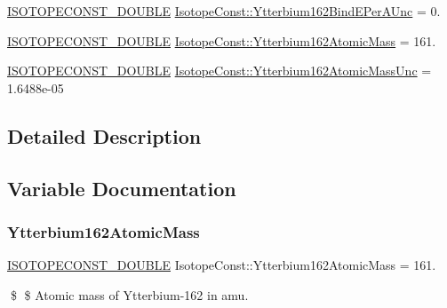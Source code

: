 \begin{DoxyCompactItemize}
\mbox{\hyperlink{group___isotope_const-_macros_ga8f45a7272ce02c0b4c65c44636ed719a}{I\+S\+O\+T\+O\+P\+E\+C\+O\+N\+S\+T\+\_\+\+D\+O\+U\+B\+LE}} \mbox{\hyperlink{group___isotope_const-_ytterbium-_yb162_ga373b56653d0e30d0dede9429f430666e}{Isotope\+Const\+::\+Ytterbium162\+Bind\+E\+Per\+A\+Unc}} = 0.
\item 
\mbox{\hyperlink{group___isotope_const-_macros_ga8f45a7272ce02c0b4c65c44636ed719a}{I\+S\+O\+T\+O\+P\+E\+C\+O\+N\+S\+T\+\_\+\+D\+O\+U\+B\+LE}} \mbox{\hyperlink{group___isotope_const-_ytterbium-_yb162_ga8205c9ef5ee8e8e7023aaa12a0047cf5}{Isotope\+Const\+::\+Ytterbium162\+Atomic\+Mass}} = 161.
\item 
\mbox{\hyperlink{group___isotope_const-_macros_ga8f45a7272ce02c0b4c65c44636ed719a}{I\+S\+O\+T\+O\+P\+E\+C\+O\+N\+S\+T\+\_\+\+D\+O\+U\+B\+LE}} \mbox{\hyperlink{group___isotope_const-_ytterbium-_yb162_ga36da0ada5fb519d994554a5354287e04}{Isotope\+Const\+::\+Ytterbium162\+Atomic\+Mass\+Unc}} = 1.\+6488e-\/05
\end{DoxyCompactItemize}


\subsection{Detailed Description}


\subsection{Variable Documentation}
\mbox{\label{group___isotope_const-_ytterbium-_yb162_ga8205c9ef5ee8e8e7023aaa12a0047cf5}} 
\subsubsection{\texorpdfstring{Ytterbium162\+Atomic\+Mass}{Ytterbium162AtomicMass}}
{\footnotesize\ttfamily \mbox{\hyperlink{group___isotope_const-_macros_ga8f45a7272ce02c0b4c65c44636ed719a}{I\+S\+O\+T\+O\+P\+E\+C\+O\+N\+S\+T\+\_\+\+D\+O\+U\+B\+LE}} Isotope\+Const\+::\+Ytterbium162\+Atomic\+Mass = 161.}

\$ \$ Atomic mass of Ytterbium-\/162 in amu. \mbox{\label{group___isotope_const-_ytterbium-_yb162_ga36da0ada5fb519d994554a5354287e04}} 
